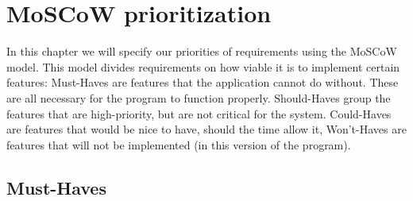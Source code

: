 \documentclass[a4paper]{article}
\begin{document}
\pagebreak
\section{MoSCoW prioritization}
In this chapter we will specify our priorities of requirements using the MoSCoW model. This model divides requirements on how viable it is to implement certain features: Must-Haves are features that the application cannot do without. These are all necessary for the program to function properly. Should-Haves group the features that are high-priority, but are not critical for the system. Could-Haves are features that would be nice to have, should the time allow it, Won't-Haves are features that will not be implemented (in this version of the program).

\subsection{Must-Haves}
\end{document}
